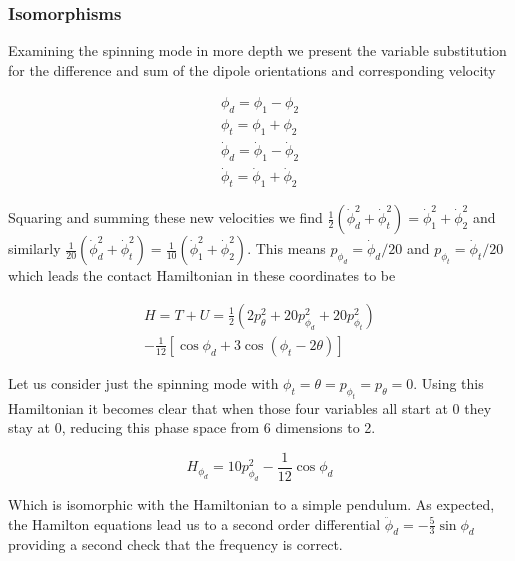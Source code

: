 \documentclass[prbg,preprint]{revtex4-1}
\begin{document}
\subsubsection{Isomorphisms} Examining the spinning mode in more depth we present the variable substitution for the difference and sum of the dipole orientations and corresponding velocity

\begin{subequations}
	\begin{gather}
		\phi_d = \phi_1-\phi_2 \\
		\phi_t = \phi_1+\phi_2 \\
		\dot\phi_d = \dot\phi_1-\dot\phi_2 \\
		\dot\phi_t = \dot\phi_1+\dot\phi_2 
	\end{gather}
\end{subequations}

Squaring and summing these new velocities we find 
$\frac{1}{2}(\dot\phi_d^2 + \dot\phi_t^2) = \dot\phi_1^2+\dot\phi_2^2$ and similarly $\frac{1}{20}(\dot\phi_d^2 + \dot\phi_t^2) = \frac{1}{10}(\dot\phi_1^2+\dot\phi_2^2)$.
This means $p_{\phi_d}=\dot\phi_d/20$ and $p_{\phi_t}=\dot\phi_t/20$ which leads the contact Hamiltonian in these coordinates to be

\begin{equation}
  \begin{multlined}
	H=T+U=
	\frac{1}{2}\left (
	2 p_\theta^2
	+20 p_{\phi_d}^2 
	+20 p_{\phi_t}^2      
        \right )
        \\
	-
	\frac{1}{12}
	[
	        \cos \phi_d
	        +3\cos(\phi_t-2\theta)
	    ]
  \end{multlined}
\end{equation}

Let us consider just the spinning mode with $\phi_t=\theta=p_{\phi_t}=p_\theta=0$. Using this Hamiltonian it becomes clear that when those four variables all start at 0 they stay at 0, reducing this phase space from 6 dimensions to 2.

\begin{equation}
	H_{\phi_d}=
	10 p_{\phi_d}^2 
	-
	\frac{1}{12}
        \cos \phi_d
\end{equation}

Which is isomorphic with the Hamiltonian to a simple pendulum. As expected, the Hamilton equations lead us to  a second order differential $\ddot \phi_d = - \frac{5}{3}\sin \phi_d$ providing a second check that the frequency is correct.
\end{document}
